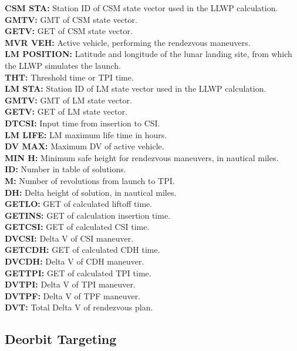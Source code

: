 \documentclass[11pt]{article} %
\begin{document}
\textbf{CSM STA:} Station ID of CSM state vector used in the LLWP calculation.\\
\textbf{GMTV:} GMT of CSM state vector.\\
\textbf{GETV:} GET of CSM state vector.\\
\textbf{MVR VEH:} Active vehicle, performing the rendezvous maneuvers.\\
\textbf{LM POSITION:} Latitude and longitude of the lunar landing site, from which the LLWP simulates the launch.\\
\textbf{THT:} Threshold time or TPI time.\\
\textbf{LM STA:} Station ID of LM state vector used in the LLWP calculation.\\
\textbf{GMTV:} GMT of LM state vector.\\
\textbf{GETV:} GET of LM state vector.\\
\textbf{DTCSI:} Input time from insertion to CSI.\\
\textbf{LM LIFE:} LM maximum life time in hours.\\
\textbf{DV MAX:} Maximum DV of active vehicle.\\
\textbf{MIN H:} Minimum safe height for rendezvous maneuvers, in nautical miles.\\

\textbf{ID:} Number in table of solutions.\\
\textbf{M:} Number of revolutions from launch to TPI.\\
\textbf{DH:} Delta height of solution, in nautical miles.\\
\textbf{GETLO:} GET of calculated liftoff time.\\
\textbf{GETINS:} GET of calculation insertion time.\\
\textbf{GETCSI:} GET of calculated CSI time.\\
\textbf{DVCSI:} Delta V of CSI maneuver.\\
\textbf{GETCDH:} GET of calculated CDH time.\\
\textbf{DVCDH:} Delta V of CDH maneuver.\\
\textbf{GETTPI:} GET of calculated TPI time.\\
\textbf{DVTPI:} Delta V of TPI maneuver.\\
\textbf{DVTPF:} Delta V of TPF maneuver.\\
\textbf{DVT:} Total Delta V of rendezvous plan.\\

\newpage
\subsection{Deorbit Targeting}
\end{document}
